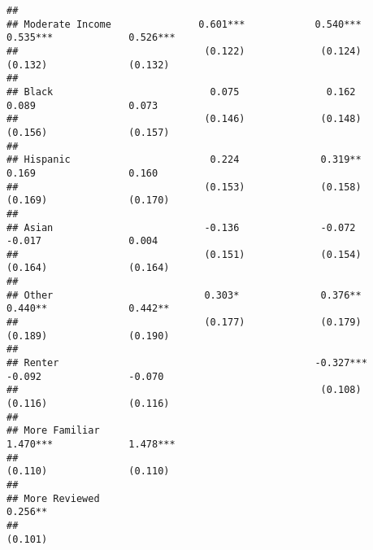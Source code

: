\documentclass[
]{article}
\begin{document}
\begin{verbatim}
##                                                                                                           
## Moderate Income               0.601***            0.540***             0.535***             0.526***      
##                                (0.122)             (0.124)             (0.132)              (0.132)       
##                                                                                                           
## Black                           0.075               0.162               0.089                0.073        
##                                (0.146)             (0.148)             (0.156)              (0.157)       
##                                                                                                           
## Hispanic                        0.224              0.319**              0.169                0.160        
##                                (0.153)             (0.158)             (0.169)              (0.170)       
##                                                                                                           
## Asian                          -0.136              -0.072               -0.017               0.004        
##                                (0.151)             (0.154)             (0.164)              (0.164)       
##                                                                                                           
## Other                          0.303*              0.376**             0.440**              0.442**       
##                                (0.177)             (0.179)             (0.189)              (0.190)       
##                                                                                                           
## Renter                                            -0.327***             -0.092               -0.070       
##                                                    (0.108)             (0.116)              (0.116)       
##                                                                                                           
## More Familiar                                                          1.470***             1.478***      
##                                                                        (0.110)              (0.110)       
##                                                                                                           
## More Reviewed                                                                               0.256**       
##                                                                                             (0.101)       

\end{verbatim}
\end{document}
